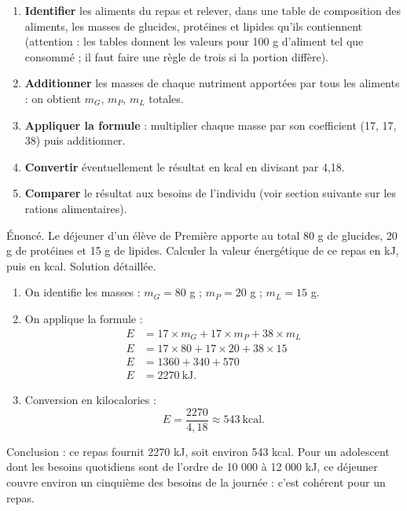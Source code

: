 \documentclass[11pt]{article}
\begin{document}
\begin{methode}
\begin{enumerate}
\item \textbf{Identifier} les aliments du repas et relever, dans une table de composition des aliments, les masses de glucides, protéines et lipides qu'ils contiennent (attention : les tables donnent les valeurs pour 100 g d'aliment tel que consommé ; il faut faire une règle de trois si la portion diffère).
\item \textbf{Additionner} les masses de chaque nutriment apportées par tous les aliments : on obtient $m_G$, $m_P$, $m_L$ totales.
\item \textbf{Appliquer la formule} : multiplier chaque masse par son coefficient (17, 17, 38) puis additionner.
\item \textbf{Convertir} éventuellement le résultat en kcal en divisant par 4,18.
\item \textbf{Comparer} le résultat aux besoins de l'individu (voir section suivante sur les rations alimentaires).
\end{enumerate}
\end{methode}

\begin{exoresolu}
Énoncé. Le déjeuner d'un élève de Première apporte au total 80 g de glucides, 20 g de protéines et 15 g de lipides. Calculer la valeur énergétique de ce repas en kJ, puis en kcal.
\tcblower
Solution détaillée.
\begin{enumerate}
\item On identifie les masses : $m_G = 80$ g ; $m_P = 20$ g ; $m_L = 15$ g.
\item On applique la formule :
\begin{align*}
E &= 17 \times m_G + 17 \times m_P + 38 \times m_L \\
E &= 17 \times 80 + 17 \times 20 + 38 \times 15 \\
E &= 1360 + 340 + 570 \\
E &= 2270~\text{kJ}.
\end{align*}
\item Conversion en kilocalories :
\[ E = \frac{2270}{4{,}18} \approx 543~\text{kcal}. \]
\end{enumerate}
Conclusion : ce repas fournit 2270 kJ, soit environ 543 kcal. Pour un adolescent dont les besoins quotidiens sont de l'ordre de 10 000 à 12 000 kJ, ce déjeuner couvre environ un cinquième des besoins de la journée : c'est cohérent pour un repas.
\end{exoresolu}
\end{document}
